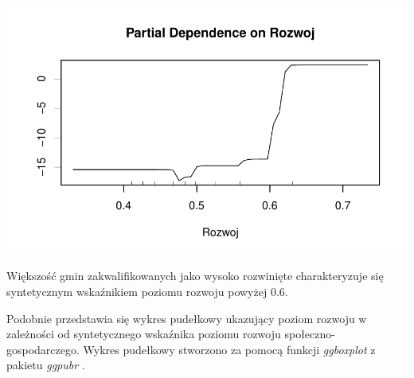 \documentclass{amuthesis}
\begin{document}
\begin{Shaded}
\begin{Highlighting}[]
\SpecialCharTok{::}
    \NormalTok{)}
\end{Highlighting}
\end{Shaded}

\begin{center}\includegraphics[width=0.9\linewidth]{figures/unnamed-chunk-26-1} \end{center}

Większość gmin zakwalifikowanych jako wysoko rozwinięte charakteryzuje się syntetycznym wskaźnikiem poziomu rozwoju powyżej \(0.6\).

Podobnie przedstawia się wykres pudełkowy ukazujący poziom rozwoju w zależności od syntetycznego wskaźnika poziomu rozwoju społeczno-gospodarczego. Wykres pudełkowy stworzono za pomocą funkcji \emph{ggboxplot} z pakietu \emph{ggpubr} \autocite{R-ggpubr}.

\begin{Shaded}
\begin{Highlighting}[]
\SpecialCharTok{::} \NormalTok{, } \NormalTok{, }
           \NormalTok{,}
           \NormalTok{, } \NormalTok{)}
\end{Highlighting}
\end{Shaded}
\end{document}
